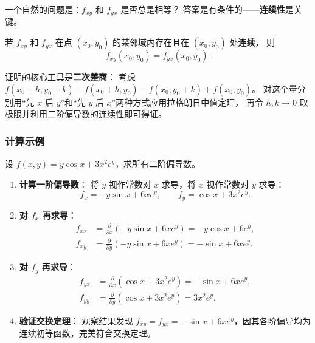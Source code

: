 \documentclass[lang=cn,11pt]{elegantbook}
\begin{document}
一个自然的问题是：$f_{xy}$ 和 $f_{yx}$ 是否总是相等？
答案是有条件的——\textbf{连续性}是关键。

\begin{theorem} \label{thm:mixed-pd-exchange}
若 $f_{xy}$ 和 $f_{yx}$ 在点 $(x_0,y_0)$ 的某邻域内存在且在 $(x_0,y_0)$ 处\textbf{连续}，
则
\[
\boxed{\;f_{xy}(x_0,y_0)=f_{yx}(x_0,y_0)\;}.
\]
\end{theorem}

\begin{note}[证明思路]
证明的核心工具是\textbf{二次差商}：
考虑 $f(x_0+h,y_0+k)-f(x_0+h,y_0)-f(x_0,y_0+k)+f(x_0,y_0)$。
对这个量分别用“先 $x$ 后 $y$”和“先 $y$ 后 $x$”两种方式应用拉格朗日中值定理，
再令 $h,k\to 0$ 取极限并利用二阶偏导数的连续性即可得证。
\end{note}


\subsubsection*{计算示例}

\begin{exercise}[二阶偏导数的完整计算] \label{ex:hessian-basic}
设 $f(x,y)=y\cos x+3x^2e^y$，求所有二阶偏导数。
\end{exercise}

\begin{solution}
\begin{enumerate}
  \item \textbf{计算一阶偏导数}：
  将 $y$ 视作常数对 $x$ 求导，将 $x$ 视作常数对 $y$ 求导：
  \[
  f_x=-y\sin x+6xe^y,\qquad f_y=\cos x+3x^2e^y.
  \]

  \item \textbf{对 $f_x$ 再求导}：
  \begin{align*}
  f_{xx}&=\frac{\partial}{\partial x}(-y\sin x+6xe^y)
        =-y\cos x+6e^y,\\
  f_{xy}&=\frac{\partial}{\partial y}(-y\sin x+6xe^y)
        =-\sin x+6xe^y.
  \end{align*}

  \item \textbf{对 $f_y$ 再求导}：
  \begin{align*}
  f_{yx}&=\frac{\partial}{\partial x}(\cos x+3x^2e^y)
        =-\sin x+6xe^y,\\
  f_{yy}&=\frac{\partial}{\partial y}(\cos x+3x^2e^y)
        =3x^2e^y.
  \end{align*}

  \item \textbf{验证交换定理}：
  观察结果发现 $f_{xy}=f_{yx}=-\sin x+6xe^y$，因其各阶偏导均为连续初等函数，完美符合交换定理。
\end{enumerate}
\end{solution}
\end{document}
